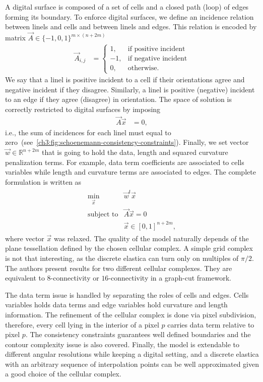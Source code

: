A digital surface is composed of a set of cells and a closed path (loop) of edges forming its boundary. To enforce digital surfaces, we define an incidence relation between linels and cells and between linels and edges. This relation is encoded by matrix $\vec{A} \in \{-1,0,1\}^{m\times(n+2m)}$ 
\begin{align*}
	\vec{A}_{i,j} &= \left\{ \begin{array}{rl}
		1,& \text{if positive incident}\\
		-1,& \text{if negative incident}\\
		0,& \text{otherwise}.		
	\end{array}\right.
\end{align*}
%
We say that a linel is positive incident to a cell if their orientations agree and negative incident if they disagree. Similarly, a linel is positive (negative) incident to an edge if they agree (disagree) in orientation. The space of solution is correctly restricted to digital surfaces by imposing
\begin{align*}
	\vec{A}\vec{x} &=0,
\end{align*}
%
i.e., the sum of incidences for each linel must equal to zero~(see~\cref{ch3:fig:schoenemann-consistency-constraints}). Finally, we set vector $\vec{w} \in \mathbb{R}^{n+2m}$ that is going to hold the data, length and squared curvature penalization terms. For example, data term coefficients are associated to cells variables while length and curvature terms are associated to edges. The complete formulation is written as
\begin{align*}
	\begin{array}{rl}
		\min_{\vec{x}} & \vec{w}^t\vec{x}\\
		\text{subject to} & \vec{A}\vec{x} = 0 \\
		& \vec{x} \in [0,1]^{n+2m},
	\end{array}
\end{align*}
%
%
where vector $\vec{x}$ was relaxed. The quality of the model naturally depends of the plane tessellation defined by the chosen cellular complex. A simple grid complex is not that interesting, as the discrete elastica can turn only on multiples of $\pi/2$. The authors present results for two different cellular complexes. They are equivalent to $8$-connectivity or $16$-connectivity in a graph-cut framework. 

The data term issue is handled by separating the roles of cells and edges. Cells variables holds data terms and edge variables hold curvature and length information. The refinement of the cellular complex is done via pixel subdivision, therefore, every cell lying in the interior of a pixel $p$ carries data term relative to pixel $p$. The consistency constraints guarantees well defined boundaries and the contour complexity issue is also covered. Finally, the model is extendable to different angular resolutions while keeping a digital setting, and a discrete elastica with an arbitrary sequence of interpolation points can be well approximated given a good choice of the cellular complex.

